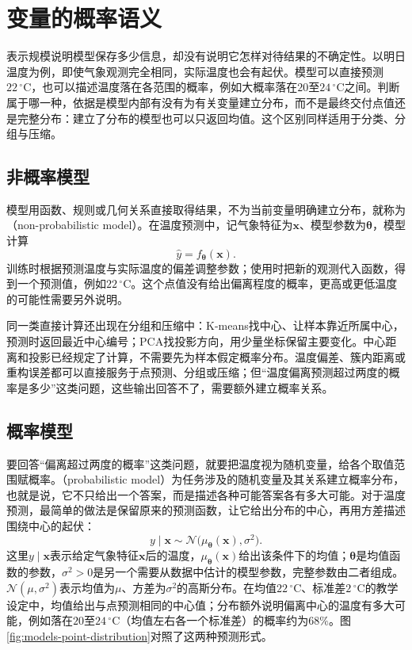 \section{变量的概率语义}
\label{sec:models-probability}

表示规模说明模型保存多少信息，却没有说明它怎样对待结果的不确定性。以明日温度为例，即使气象观测完全相同，实际温度也会有起伏。模型可以直接预测$22\,^{\circ}\mathrm{C}$，也可以描述温度落在各范围的概率，例如大概率落在$20$至$24\,^{\circ}\mathrm{C}$之间。判断属于哪一种，依据是模型内部有没有为有关变量建立分布，而不是最终交付点值还是完整分布：建立了分布的模型也可以只返回均值。这个区别同样适用于分类、分组与压缩。

\subsection{非概率模型}
\label{sec:models-nonprobabilistic}

模型用函数、规则或几何关系直接取得结果，不为当前变量明确建立分布，就称为（non-probabilistic model）。在温度预测中，记气象特征为$\bm{x}$、模型参数为$\bm{\theta}$，模型计算
\begin{equation}
  \hat{y}=f_{\bm{\theta}}(\bm{x}).
  \label{eq:models-point-prediction}
\end{equation}
训练时根据预测温度与实际温度的偏差调整参数；使用时把新的观测代入函数，得到一个预测值，例如$22\,^{\circ}\mathrm{C}$。这个点值没有给出偏离程度的概率，更高或更低温度的可能性需要另外说明。

同一类直接计算还出现在分组和压缩中：K-means找中心、让样本靠近所属中心，预测时返回最近中心编号；PCA找投影方向，用少量坐标保留主要变化。中心距离和投影已经规定了计算，不需要先为样本假定概率分布。温度偏差、簇内距离或重构误差都可以直接服务于点预测、分组或压缩；但“温度偏离预测超过两度的概率是多少”这类问题，这些输出回答不了，需要额外建立概率关系。

\subsection{概率模型}
\label{sec:models-probabilistic}

要回答“偏离超过两度的概率”这类问题，就要把温度视为随机变量，给各个取值范围赋概率。（probabilistic model）为任务涉及的随机变量及其关系建立概率分布，也就是说，它不只给出一个答案，而是描述各种可能答案各有多大可能。对于温度预测，最简单的做法是保留原来的预测函数，让它给出分布的中心，再用方差描述围绕中心的起伏：
\begin{equation}
  y\mid\bm{x}\sim\mathcal{N}\bigl(\mu_{\bm{\theta}}(\bm{x}),\sigma^2\bigr).
  \label{eq:models-linear-gaussian}
\end{equation}
这里$y\mid\bm{x}$表示给定气象特征$\bm{x}$后的温度，$\mu_{\bm{\theta}}(\bm{x})$给出该条件下的均值；$\bm{\theta}$是均值函数的参数，$\sigma^2>0$是另一个需要从数据中估计的模型参数，完整参数由二者组成。$\mathcal{N}(\mu,\sigma^2)$表示均值为$\mu$、方差为$\sigma^2$的高斯分布。在均值$22\,^{\circ}\mathrm{C}$、标准差$2\,^{\circ}\mathrm{C}$的教学设定中，均值给出与点预测相同的中心值；分布额外说明偏离中心的温度有多大可能，例如落在$20$至$24\,^{\circ}\mathrm{C}$（均值左右各一个标准差）的概率约为$68\%$。图\ref{fig:models-point-distribution}对照了这两种预测形式。

